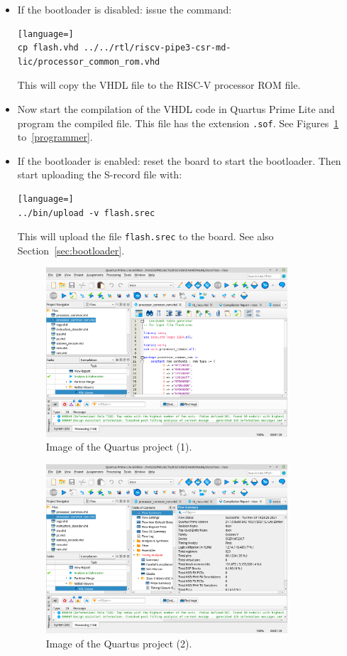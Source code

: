 \documentclass[12pt]{article}
\begin{document}
\begin{itemize}
\item If the bootloader is disabled: issue the command:
\begin{lstlisting}[language=]
cp flash.vhd ../../rtl/riscv-pipe3-csr-md-lic/processor_common_rom.vhd
\end{lstlisting}
This will copy the VHDL file to the RISC-V processor ROM file.
\item Now start the compilation of the VHDL code in Quartus Prime Lite and program the compiled file. This file has the extension \lstinline|.sof|. See Figures~\ref{quartus1} to~\ref{programmer}.
\item If the bootloader is enabled: reset the board to start the bootloader. Then start uploading the S-record file with:
\begin{lstlisting}[language=]
../bin/upload -v flash.srec
\end{lstlisting}
This will upload the file \lstinline|flash.srec| to the board. See also Section~\ref{sec:bootloader}.

\begin{figure}[!ht]
\centering
\includegraphics[width=0.85\textwidth]{images/quartus1}
\caption{Image of the Quartus project (1).}
\label{quartus1}
\end{figure}

\begin{figure}[!ht]
\centering
\includegraphics[width=0.85\textwidth]{images/quartus2}
\caption{Image of the Quartus project (2).}
\label{quartus2}
\end{figure}


\end{itemize}
\end{document}
